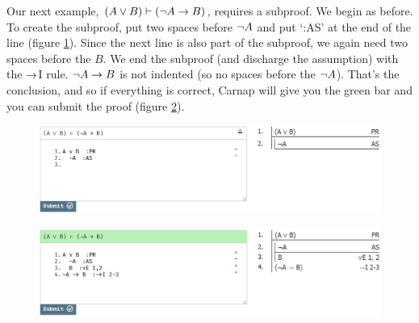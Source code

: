 Our next example, $(A \vee B) \vdash ({\neg} A \rightarrow B)$, requires a subproof. We begin as before. To create the subproof, put two spaces before ${\neg} A$ and put `:AS' at the end of the line (figure \ref{fig:proof-2a}). Since the next line is also part of the subproof, we again need two spaces before the $B$. We end the subproof (and discharge the assumption) with the $\rightarrow$I rule. ${\neg} A \rightarrow B$ is not indented (so no spaces before the ${\neg} A$). That's the conclusion, and so if everything is correct, Carnap will give you the green bar and you can submit the proof (figure \ref{fig:proof-2b}). 

\begin{figure}[h]
\includegraphics[width=13cm]{textbook--2a.PNG}
\caption{}
\label{fig:proof-2a}
\end{figure}

\begin{figure}[h]
\includegraphics[width=13cm]{textbook--2b.PNG}
\caption{}
\label{fig:proof-2b}
\end{figure}

